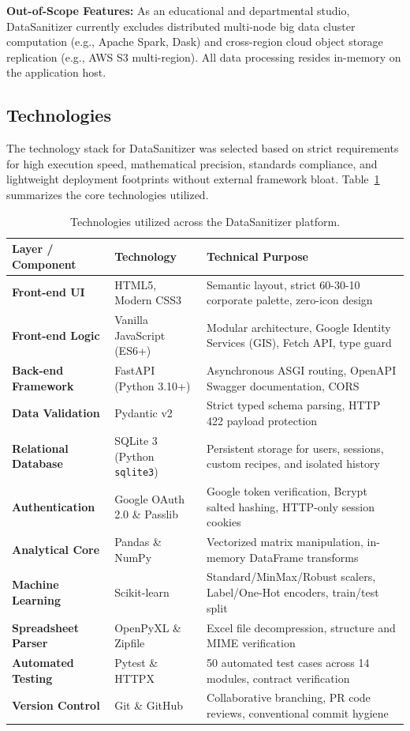 \textbf{Out-of-Scope Features:}
As an educational and departmental studio, DataSanitizer currently excludes distributed multi-node big data cluster computation (e.g., Apache Spark, Dask) and cross-region cloud object storage replication (e.g., AWS S3 multi-region). All data processing resides in-memory on the application host.

\subsection{Technologies}
The technology stack for DataSanitizer was selected based on strict requirements for high execution speed, mathematical precision, standards compliance, and lightweight deployment footprints without external framework bloat. Table~\ref{tab:tech} summarizes the core technologies utilized.

\begin{table}[ht]
\centering\small
\renewcommand{\arraystretch}{1.2}
\begin{tabular}{@{}lll@{}}
\toprule
\textbf{Layer / Component} & \textbf{Technology} & \textbf{Technical Purpose}\\
\midrule
\textbf{Front-end UI}       & HTML5, Modern CSS3      & Semantic layout, strict 60-30-10 corporate palette, zero-icon design\\
\textbf{Front-end Logic}    & Vanilla JavaScript (ES6+) & Modular architecture, Google Identity Services (GIS), Fetch API, type guard\\
\textbf{Back-end Framework} & FastAPI (Python 3.10+)  & Asynchronous ASGI routing, OpenAPI Swagger documentation, CORS\\
\textbf{Data Validation}    & Pydantic v2             & Strict typed schema parsing, HTTP 422 payload protection\\
\textbf{Relational Database}& SQLite 3 (Python \texttt{sqlite3}) & Persistent storage for users, sessions, custom recipes, and isolated history\\
\textbf{Authentication}     & Google OAuth 2.0 \& Passlib & Google token verification, Bcrypt salted hashing, HTTP-only session cookies\\
\textbf{Analytical Core}    & Pandas \& NumPy         & Vectorized matrix manipulation, in-memory DataFrame transforms\\
\textbf{Machine Learning}   & Scikit-learn            & Standard/MinMax/Robust scalers, Label/One-Hot encoders, train/test split\\
\textbf{Spreadsheet Parser} & OpenPyXL \& Zipfile     & Excel file decompression, structure and MIME verification\\
\textbf{Automated Testing}  & Pytest \& HTTPX         & 50 automated test cases across 14 modules, contract verification\\
\textbf{Version Control}    & Git \& GitHub           & Collaborative branching, PR code reviews, conventional commit hygiene\\
\bottomrule
\end{tabular}
\caption{Technologies utilized across the DataSanitizer platform.}
\label{tab:tech}
\end{table}


